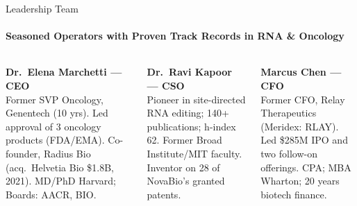\documentclass[aspectratio=169,10pt]{beamer}
\begin{document}
\begin{frame}{Leadership Team}
  \framesubtitle{Seasoned Operators with Proven Track Records in RNA \& Oncology}
  \begin{columns}[T,onlytextwidth]
    \setlength{\parindent}{0pt}\setlength{\parskip}{0pt}
    \begin{tcolorbox}[enhanced,colback=PaperWhite,colframe=NavyLight,
      arc=4pt,boxrule=0.5pt,left=6pt,right=6pt,top=5pt,bottom=5pt,
      shadow={2pt}{-2pt}{0pt}{black!15}]
      {\color{NavyLight}\small\bfseries Dr.\ Elena Marchetti --- CEO}\\[2pt]
      {\tiny Former SVP Oncology, Genentech (10 yrs).
      Led approval of 3 oncology products (FDA/EMA).
      Co-founder, Radius Bio (acq.\ Helvetia Bio \$1.8B, 2021).
      MD/PhD Harvard; Boards: AACR, BIO.}
    \end{tcolorbox}
    \vspace{5pt}
    \begin{tcolorbox}[enhanced,colback=PaperWhite,colframe=NavyLight,
      arc=4pt,boxrule=0.5pt,left=6pt,right=6pt,top=5pt,bottom=5pt,
      shadow={2pt}{-2pt}{0pt}{black!15}]
      {\color{NavyLight}\small\bfseries Dr.\ Ravi Kapoor --- CSO}\\[2pt]
      {\tiny Pioneer in site-directed RNA editing; 140+ publications;
      h-index 62. Former Broad Institute/MIT faculty.
      Inventor on 28 of NovaBio's granted patents.}
    \end{tcolorbox}
    \vspace{5pt}
    \begin{tcolorbox}[enhanced,colback=PaperWhite,colframe=NavyLight,
      arc=4pt,boxrule=0.5pt,left=6pt,right=6pt,top=5pt,bottom=5pt,
      shadow={2pt}{-2pt}{0pt}{black!15}]
      {\color{NavyLight}\small\bfseries Marcus Chen --- CFO}\\[2pt]
      {\tiny Former CFO, Relay Therapeutics (Meridex: RLAY).
      Led \$285M IPO and two follow-on offerings.
      CPA; MBA Wharton; 20 years biotech finance.}
    \end{tcolorbox}


\end{columns}
\end{frame}
\end{document}
